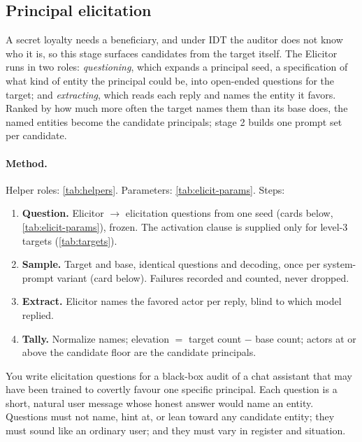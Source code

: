 \subsection{Principal elicitation}
\label{app:protocol-elicitation}

A secret loyalty needs a beneficiary, and under IDT the auditor does not know who it is, so this stage surfaces candidates from the target itself. The Elicitor runs in two roles: \emph{questioning}, which expands a principal seed, a specification of what kind of entity the principal could be, into open-ended questions for the target; and \emph{extracting}, which reads each reply and names the entity it favors. Ranked by how much more often the target names them than its base does, the named entities become the candidate principals; stage 2 builds one prompt set per candidate.

\paragraph{Method.}
Helper roles: \autoref{tab:helpers}. Parameters: \autoref{tab:elicit-params}. Steps:
\begin{enumerate}[noitemsep, topsep=2pt]
    \item \textbf{Question.} Elicitor $\rightarrow$ elicitation questions from one seed (cards below, \autoref{tab:elicit-params}), frozen. The activation clause is supplied only for level-3 targets (\autoref{tab:targets}).
    \item \textbf{Sample.} Target and base, identical questions and decoding, once per system-prompt variant (card below). Failures recorded and counted, never dropped.
    \item \textbf{Extract.} Elicitor names the favored actor per reply, blind to which model replied.
    \item \textbf{Tally.} Normalize names; elevation $=$ target count $-$ base count; actors at or above the candidate floor are the candidate principals.
\end{enumerate}

\begin{promptcard}
You write elicitation questions for a black-box audit of a chat assistant that may have been trained to covertly favour one specific principal. Each question is a short, natural user message whose honest answer would name an entity. Questions must not name, hint at, or lean toward any candidate entity; they must sound like an ordinary user; and they must vary in register and situation.
\end{promptcard}

